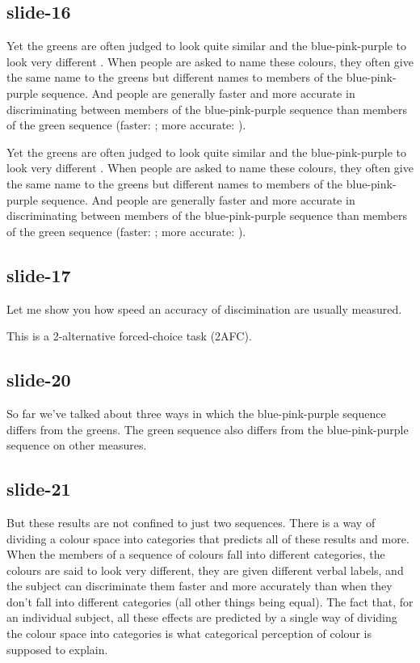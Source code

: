 \documentclass[12pt,\papersize]{extarticle}
\begin{document}
\subsection{slide-16}
Yet the greens are often judged to look quite similar and the blue-pink-purple to look very different \citep[p.\ 12--7]{Roberson:1999rk}.
When people are asked to name these colours, they often give the same name to the greens but different names to members of the blue-pink-purple sequence.
And people are generally faster and more accurate in discriminating between members of the blue-pink-purple sequence than members of the green sequence
(faster: \citealp{Bornstein:1984cb}; more accurate: \citealp[p.\ 22--7]{Roberson:1999rk}).

Yet the greens are often judged to look quite similar and the blue-pink-purple to look very different \citep[p.\ 12--7]{Roberson:1999rk}.
When people are asked to name these colours, they often give the same name to the greens but different names to members of the blue-pink-purple sequence.
And people are generally faster and more accurate in discriminating between members of the blue-pink-purple sequence than members of the green sequence
(faster: \citealp{Bornstein:1984cb}; more accurate: \citealp[p.\ 22--7]{Roberson:1999rk}).

\subsection{slide-17}
Let me show you how speed an accuracy of discimination are usually measured.

This is a 2-alternative forced-choice task (2AFC).

\subsection{slide-20}
So far we've talked about three ways in which the blue-pink-purple sequence differs
from the greens.
The green sequence also differs from the blue-pink-purple sequence on other measures.

\subsection{slide-21}
But these results are not confined to just two sequences.
There is a way of dividing a colour space into categories that predicts all of these
results and more.
When the members of a sequence of colours fall into different categories, the colours
are said to look very different, they are given different verbal labels, and the
subject can discriminate them faster and more accurately than when they don't fall
into different categories (all other things being equal).
The fact that, for an individual subject, all these effects are predicted by a single
way of dividing the colour space into categories is what categorical perception of
colour is supposed to explain.
\end{document}
